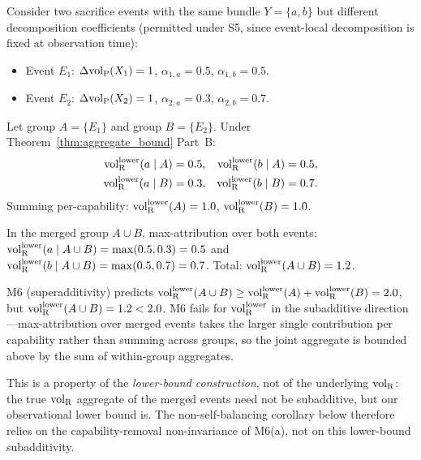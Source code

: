 \begin{example}
\label{ex:m6_fail_volRlower}
Consider two sacrifice events with the same bundle
$Y = \{a, b\}$ but different decomposition coefficients
(permitted under S5, since event-local decomposition is fixed at
observation time):
\begin{itemize}
\item Event $E_1$: $\Delta{\operatorname{vol}_{\mathrm{P}}}(X_1) = 1$, $\alpha_{1,a} = 0.5$,
  $\alpha_{1,b} = 0.5$.
\item Event $E_2$: $\Delta{\operatorname{vol}_{\mathrm{P}}}(X_2) = 1$, $\alpha_{2,a} = 0.3$,
  $\alpha_{2,b} = 0.7$.
\end{itemize}
Let group $A = \{E_1\}$ and group $B = \{E_2\}$.  Under
Theorem~\ref{thm:aggregate_bound} Part~B:
\begin{align*}
  {\operatorname{vol}_{\mathrm{R}}^{\mathrm{lower}}}(a \mid A) &= 0.5, &
  {\operatorname{vol}_{\mathrm{R}}^{\mathrm{lower}}}(b \mid A) &= 0.5, \\
  {\operatorname{vol}_{\mathrm{R}}^{\mathrm{lower}}}(a \mid B) &= 0.3, &
  {\operatorname{vol}_{\mathrm{R}}^{\mathrm{lower}}}(b \mid B) &= 0.7.
\end{align*}
Summing per-capability:
${\operatorname{vol}_{\mathrm{R}}^{\mathrm{lower}}}(A) = 1.0$, ${\operatorname{vol}_{\mathrm{R}}^{\mathrm{lower}}}(B) = 1.0$.

In the merged group $A \cup B$, max-attribution over both events:
${\operatorname{vol}_{\mathrm{R}}^{\mathrm{lower}}}(a \mid A \cup B) = \max(0.5, 0.3) = 0.5$ and
${\operatorname{vol}_{\mathrm{R}}^{\mathrm{lower}}}(b \mid A \cup B) = \max(0.5, 0.7) = 0.7$.
Total: ${\operatorname{vol}_{\mathrm{R}}^{\mathrm{lower}}}(A \cup B) = 1.2$.

M6 (superadditivity) predicts ${\operatorname{vol}_{\mathrm{R}}^{\mathrm{lower}}}(A \cup B) \geq
{\operatorname{vol}_{\mathrm{R}}^{\mathrm{lower}}}(A) + {\operatorname{vol}_{\mathrm{R}}^{\mathrm{lower}}}(B) = 2.0$, but ${\operatorname{vol}_{\mathrm{R}}^{\mathrm{lower}}}(A \cup B)
= 1.2 < 2.0$.  M6 fails for ${\operatorname{vol}_{\mathrm{R}}^{\mathrm{lower}}}$ in the subadditive
direction---max-attribution over merged events takes the larger
single contribution per capability rather than summing
across groups, so the joint aggregate is bounded above by the
sum of within-group aggregates.

This is a property of the \emph{lower-bound construction}, not of
the underlying ${\operatorname{vol}_{\mathrm{R}}}$: the true ${\operatorname{vol}_{\mathrm{R}}}$ aggregate of the merged
events need not be subadditive, but our observational lower
bound is.  The non-self-balancing corollary below therefore
relies on the capability-removal non-invariance of M6(a), not
on this lower-bound subadditivity.
\end{example}

